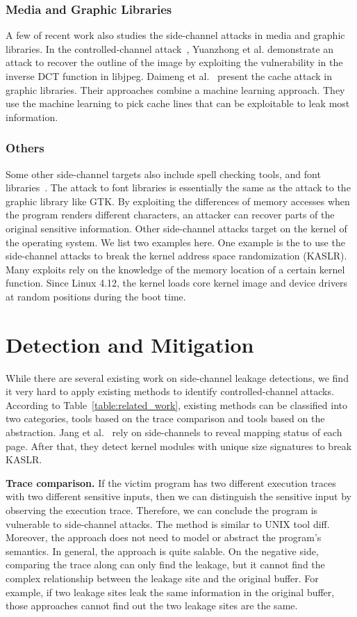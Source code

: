 \subsubsection{Media and Graphic Libraries}
A few of recent work also studies the side-channel attacks in media and graphic libraries. In the controlled-channel attack~\cite{xu2015controlled}, Yuanzhong et al. demonstrate an attack to recover the outline of the image by exploiting the vulnerability in the inverse DCT function in libjpeg. Daimeng et al.~\cite{wang2019unveiling} present the cache attack in graphic libraries. Their approaches combine a machine learning approach. They use the machine learning to pick cache lines that can be exploitable to leak most information.
\subsubsection{Others}
Some other side-channel targets also include spell checking tools, and font libraries~\cite{xu2015controlled}. The attack to font libraries is essentially the same as the attack to the graphic library like GTK. By exploiting the differences of memory accesses when the program renders different characters, an attacker can recover parts of the original sensitive information. Other side-channel attacks target on the kernel of the operating system. We list two examples here. One example is the to use the side-channel attacks to break the kernel address space randomization (KASLR).
Many exploits rely on the knowledge of the memory location of a certain kernel function. Since Linux 4.12, the kernel loads core kernel image and device drivers at random positions during the boot time.
\section{Detection and Mitigation}
While there are several existing work on side-channel leakage detections, we find it very hard to apply existing methods to identify controlled-channel attacks. According to Table~\ref{table:related_work}, existing methods can be classified into two categories, tools based on the trace comparison and tools based on the abstraction. Jang et al.~\cite{jang2016breaking} rely on side-channels to reveal mapping status of each page. After that, they detect kernel modules with unique size signatures to break KASLR.

\textbf{Trace comparison.} If the victim program has two different execution traces with two different sensitive inputs, then we can distinguish the sensitive input by observing the execution trace. Therefore, we can conclude the program is vulnerable to side-channel attacks. The method is similar to UNIX tool \textsf{diff}. Moreover, the approach does not need to model or abstract the program's semantics. In general, the approach is quite salable. On the negative side, comparing the trace along can only find the leakage, but it cannot find the complex relationship between the leakage site and the original buffer. For example, if two leakage sites leak the same information in the original buffer, those approaches cannot find out the two leakage sites are the same. 

